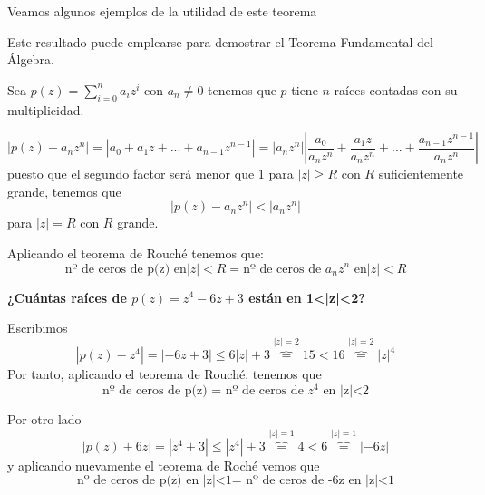 \documentclass{apuntes}
\begin{document}
Veamos algunos ejemplos de la utilidad de este teorema
\begin{example}
Este resultado puede emplearse para demostrar el Teorema Fundamental del Álgebra.

Sea $p(z)=\sum\limits_{i=0}^{n} a_iz^i$ con $a_n\neq 0$ tenemos que $p$ tiene $n$ raíces contadas con su multiplicidad.

\[|p(z)-a_nz^n| = |a_0+a_1z+...+a_{n-1}z^{n-1}| = |a_nz^n|\left| \frac{a_0}{a_nz^n}+ \frac{a_1z}{a_nz^n}+...+ \frac{a_{n-1}z^{n-1}}{a_nz^n}\right|\]
puesto que el segundo factor será menor que 1 para $|z|\geq R$ con $R$ suficientemente grande, tenemos que
\[|p(z)-a_nz^n|  < |a_nz^n|\]
para $|z|=R$ con $R$ grande.

Aplicando el teorema de Rouché tenemos que:
\[\text{nº de ceros de p(z) en} |z|<R = \text{nº de ceros de } a_nz^n \text{ en} |z| < R \]

\end{example}

\begin{example}
\textbf{¿Cuántas raíces de $p(z)=z^4-6z+3$ están en 1<|z|<2?}

Escribimos
\[|p(z)-z^4| = |-6z+3|\leq 6|z|+3 \overbrace{=}^{|z|=2} 15 < 16 \overbrace{=}^{|z|=2}|z|^4 \]
Por tanto, aplicando el teorema de Rouché, tenemos que
\[\text{nº de ceros de p(z) = nº de ceros de } z^4 \text{ en |z|<2}\]

Por otro lado
\[|p(z)+6z|=|z^4+3|\leq |z^4|+3 \overbrace{=}^{|z|=1} 4 < 6\overbrace{=}^{|z|=1}|-6z|\]
y aplicando nuevamente el teorema de Roché vemos que
\[\text{nº de ceros de p(z) en |z|<1= nº de ceros de -6z en |z|<1}\]
\end{example}
\end{document}
